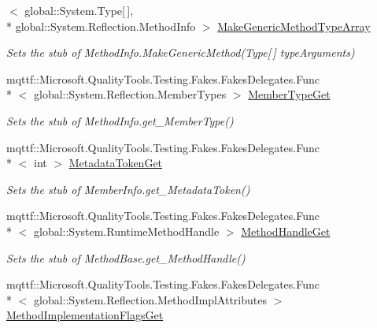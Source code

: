 \begin{DoxyCompactItemize}
$<$ global\-::\-System.\-Type\mbox{[}$\,$\mbox{]}, \\*
global\-::\-System.\-Reflection.\-Method\-Info $>$ \hyperlink{class_system_1_1_reflection_1_1_fakes_1_1_stub_method_info_aacbbe857295038f3b757a1841e0b7a75}{Make\-Generic\-Method\-Type\-Array}
\begin{DoxyCompactList}\small\item\em Sets the stub of Method\-Info.\-Make\-Generic\-Method(\-Type\mbox{[}$\,$\mbox{]} type\-Arguments)\end{DoxyCompactList}\item 
mqttf\-::\-Microsoft.\-Quality\-Tools.\-Testing.\-Fakes.\-Fakes\-Delegates.\-Func\\*
$<$ global\-::\-System.\-Reflection.\-Member\-Types $>$ \hyperlink{class_system_1_1_reflection_1_1_fakes_1_1_stub_method_info_a05b271b962c6d8223217e8a8c8a6bd00}{Member\-Type\-Get}
\begin{DoxyCompactList}\small\item\em Sets the stub of Method\-Info.\-get\-\_\-\-Member\-Type()\end{DoxyCompactList}\item 
mqttf\-::\-Microsoft.\-Quality\-Tools.\-Testing.\-Fakes.\-Fakes\-Delegates.\-Func\\*
$<$ int $>$ \hyperlink{class_system_1_1_reflection_1_1_fakes_1_1_stub_method_info_a1bba80f26bafd0a9a2a2d22a6def0189}{Metadata\-Token\-Get}
\begin{DoxyCompactList}\small\item\em Sets the stub of Member\-Info.\-get\-\_\-\-Metadata\-Token()\end{DoxyCompactList}\item 
mqttf\-::\-Microsoft.\-Quality\-Tools.\-Testing.\-Fakes.\-Fakes\-Delegates.\-Func\\*
$<$ global\-::\-System.\-Runtime\-Method\-Handle $>$ \hyperlink{class_system_1_1_reflection_1_1_fakes_1_1_stub_method_info_ab018ee809b263c953f9d40f20225e1df}{Method\-Handle\-Get}
\begin{DoxyCompactList}\small\item\em Sets the stub of Method\-Base.\-get\-\_\-\-Method\-Handle()\end{DoxyCompactList}\item 
mqttf\-::\-Microsoft.\-Quality\-Tools.\-Testing.\-Fakes.\-Fakes\-Delegates.\-Func\\*
$<$ global\-::\-System.\-Reflection.\-Method\-Impl\-Attributes $>$ \hyperlink{class_system_1_1_reflection_1_1_fakes_1_1_stub_method_info_a2bc806617488ff185545ae89def1ceae}{Method\-Implementation\-Flags\-Get}

\end{DoxyCompactItemize}
